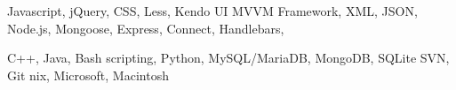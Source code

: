 
\citembullet Javascript, jQuery, CSS, Less, Kendo UI MVVM Framework, XML, JSON, 
\citembullet Node.js, Mongoose, Express, Connect, Handlebars, 

\citembullet C++, Java, Bash scripting, Python, 
\citembullet MySQL/MariaDB, MongoDB, SQLite %
\citembullet SVN, Git
\citembullet *nix, Microsoft, Macintosh  %

